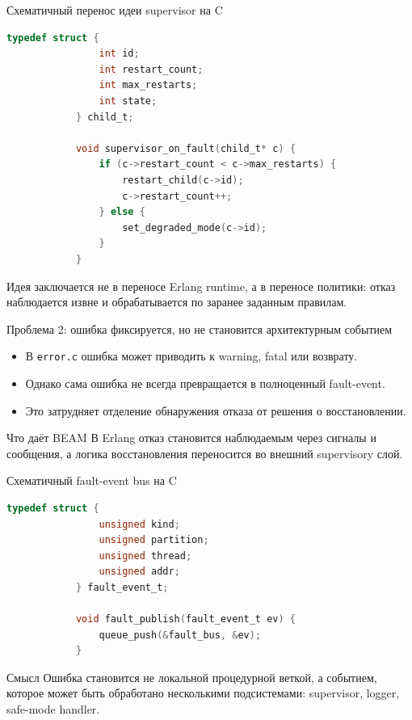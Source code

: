 \documentclass[aspectratio=169]{beamer}
\begin{document}
	\begin{frame}[fragile]{Схематичный перенос идеи supervisor на C}
		\begin{lstlisting}[language=C]
			typedef struct {
				int id;
				int restart_count;
				int max_restarts;
				int state;
			} child_t;
			
			void supervisor_on_fault(child_t* c) {
				if (c->restart_count < c->max_restarts) {
					restart_child(c->id);
					c->restart_count++;
				} else {
					set_degraded_mode(c->id);
				}
			}
		\end{lstlisting}
		
		\vspace{0.2cm}
		
			Идея заключается не в переносе Erlang runtime, а в переносе политики:
			отказ наблюдается извне и обрабатывается по заранее заданным правилам.
	\end{frame}
	
	\begin{frame}{Проблема 2: ошибка фиксируется, но не становится архитектурным событием}
		\begin{itemize}
			\item В \texttt{error.c} ошибка может приводить к warning, fatal или возврату.
			\item Однако сама ошибка не всегда превращается в полноценный fault-event.
			\item Это затрудняет отделение обнаружения отказа от решения о восстановлении.
		\end{itemize}
		
		\vspace{0.3cm}
		
		\begin{block}{Что даёт BEAM}
			В Erlang отказ становится наблюдаемым через сигналы и сообщения, а логика восстановления переносится во внешний supervisory слой.
		\end{block}
	\end{frame}
	
	\begin{frame}[fragile]{Схематичный fault-event bus на C}
		\begin{lstlisting}[language=C]
			typedef struct {
				unsigned kind;
				unsigned partition;
				unsigned thread;
				unsigned addr;
			} fault_event_t;
			
			void fault_publish(fault_event_t ev) {
				queue_push(&fault_bus, &ev);
			}
		\end{lstlisting}
		
		\vspace{0.2cm}
		
		\begin{block}{Смысл}
			Ошибка становится не локальной процедурной веткой, а событием,
			которое может быть обработано несколькими подсистемами:
			supervisor, logger, safe-mode handler.
		\end{block}
	\end{frame}
	
\end{document}
